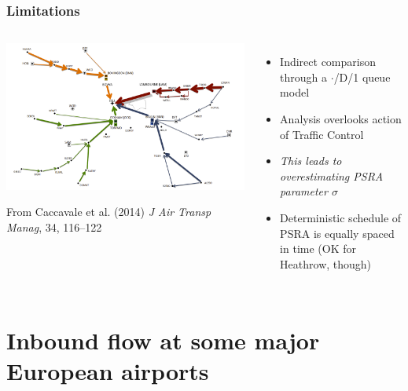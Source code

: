 \documentclass[table,aspectratio=169]{beamer}
\begin{document}
\begin{frame}[t]\frametitle{Limitations}
    \begin{columns}
        \begin{center}
            \includegraphics[width=.85\textwidth]{cills2}

            {\tiny From Caccavale et al. (2014) \emph{J Air Transp Manag}, 34, 116--122}
        \end{center}
        \begin{itemize}
            \item Indirect comparison through a \alert{$\cdot$/D/1 queue model}
            \item Analysis overlooks action of Traffic Control
            \item \emph{This leads to overestimating PSRA parameter $\sigma$}
            \item Deterministic schedule of PSRA is equally spaced in time (OK for Heathrow, though)
        \end{itemize}
    \end{columns}
\end{frame}


\section{Inbound flow at some major European airports}
\end{document}
